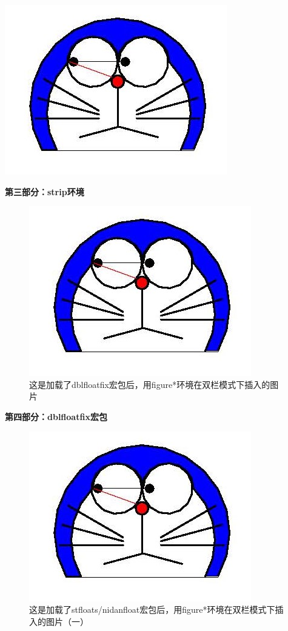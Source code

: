 ﻿\documentclass{article}
\begin{document}
\twocolumn
    \begin{strip}
        \centering
        \includegraphics[width = .1\textwidth]{doraemon1.jpg}
    \end{strip}

    \textbf{第三部分：strip环境}

    \blindtext[2]

\twocolumn
    \begin{figure}[b] %
        \includegraphics[width = .1\textwidth]{doraemon1.jpg}
        \caption{这是加载了dblfloatfix宏包后，用figure*环境在双栏模式下插入的图片}
    \end{figure}

    \textbf{第四部分：dblfloatfix宏包}

    \blindtext[4]

\twocolumn
    \begin{figure}[bp]
        \includegraphics[width = .1\textwidth]{doraemon1.jpg}
        \caption{这是加载了stfloats/nidanfloat宏包后，用figure*环境在双栏模式下插入的图片（一）}
    \end{figure}
\end{document}

